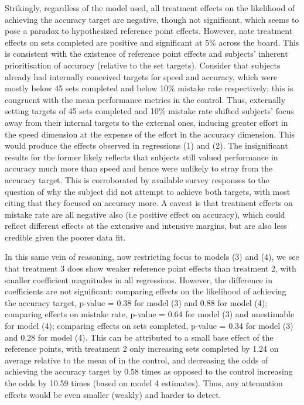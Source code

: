 \documentclass[12pt, letterpaper, DIV=11, numbers=noendperiod]{article}
\begin{document}
Strikingly, regardless of the model used, all treatment effects on the likelihood of achieving the accuracy target are negative, though not significant, which seems to pose a paradox to hypothesized reference point effects. However, note treatment effects on sets completed are positive and significant at 5\% across the board. This is consistent with the existence of reference point effects and subjects' inherent prioritisation of accuracy (relative to the set targets). Consider that subjects already had internally conceived targets for speed and accuracy, which were mostly below 45 sets completed and below 10\% mistake rate respectively; this is congruent with the mean performance metrics in the control. Thus, externally setting targets of 45 sets completed and 10\% mistake rate shifted subjects' focus away from their internal targets to the external ones, inducing greater effort in the speed dimension at the expense of the effort in the accuracy dimension. This would produce the effects observed in regressions (1) and (2). The insignificant results for the former likely reflects that subjects still valued performance in accuracy much more than speed and hence were unlikely to stray from the accuracy target. This is corroborated by available survey responses to the question of why the subject did not attempt to achieve both targets, with most citing that they focused on accuracy more. A caveat is that treatment effects on mistake rate are all negative also (i.e positive effect on accuracy), which could reflect different effects at the extensive and intensive margins, but are also less credible given the poorer data fit.

In this same vein of reasoning, now restricting focus to models (3) and (4), we see that treatment 3 does show weaker reference point effects than treatment 2, with smaller coefficient magnitudes in all regressions. However, the difference in coefficients are not significant: comparing effects on the likelihood of achieving the accuracy target, p-value = 0.38 for model (3) and 0.88 for model (4); comparing effects on mistake rate, p-value = 0.64 for model (3) and unestimable for model (4); comparing effects on sets completed, p-value = 0.34 for model (3) and 0.28 for model (4). This can be attributed to a small base effect of the reference points, with treatment 2 only increasing sets completed by 1.24 on average relative to the mean of \ControlMeanSets{} in the control, and decreasing the odds of achieving the accuracy target by 0.58 times as opposed to the control increasing the odds by 10.59 times (based on model 4 estimates). Thus, any attenuation effects would be even smaller (weakly) and harder to detect.
\end{document}
